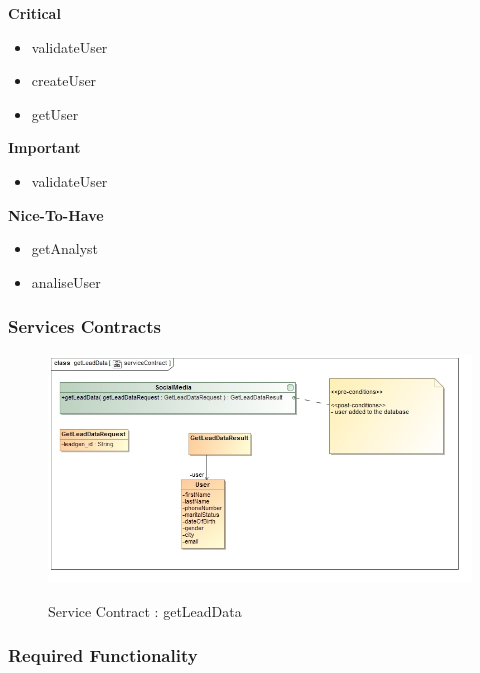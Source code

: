 \documentclass{article}
\begin{document}
		\begin{flushleft}
			\textbf{Critical}
				\begin{itemize}
	  				\item validateUser
	  				\item createUser
	  				\item getUser
				\end{itemize}
			\textbf{Important}
				\begin{itemize}
	  				\item validateUser
				\end{itemize}

			\textbf{Nice-To-Have}
				\begin{itemize}
	  				\item getAnalyst
	  				\item analiseUser
				\end{itemize}
		\end{flushleft}

		\subsubsection{Services Contracts}

		\begin{figure}[H]
		\includegraphics[width=\textwidth]{images/class__getLeadData__serviceContract.jpg}  \\
		\caption{Service Contract : getLeadData}
		\end{figure}

		\subsubsection{Required Functionality}
\end{document}
